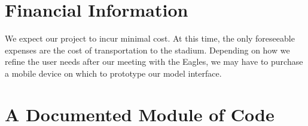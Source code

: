 \documentclass[12pt]{article}
\begin{document}
\makereferences

\makebibliography


\section{Financial Information}
We expect our project to incur minimal cost. At this time, the only
foreseeable expenses are the cost of transportation to the
stadium. Depending on how we refine the user needs after our meeting
with the Eagles, we may have to purchase a mobile device on which to
prototype our model interface.


\appendix

\section{A Documented Module of Code}

\end{document}
